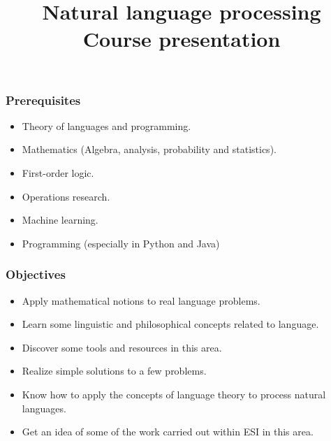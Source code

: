 \documentclass{beamer}
\title[ESI - NLP: Presentation] %
{Natural language processing\\Course presentation}
\begin{document}
 

\begin{frame}
\frametitle{Prerequisites}

\begin{itemize}
	\item Theory of languages and programming.
	\item Mathematics (Algebra, analysis, probability and statistics).
	\item First-order logic.
	\item Operations research.
	\item Machine learning.
	\item Programming (especially in Python and Java)
\end{itemize}

\end{frame}


\begin{frame}
\frametitle{Objectives}

\begin{itemize}
	\item Apply mathematical notions to real language problems.
	\item Learn some linguistic and philosophical concepts related to language.
	\item Discover some tools and resources in this area.
	\item Realize simple solutions to a few problems.
	\item Know how to apply the concepts of language theory to process natural languages.
	\item Get an idea of some of the work carried out within ESI in this area.
\end{itemize}

\end{frame}
\end{document}
